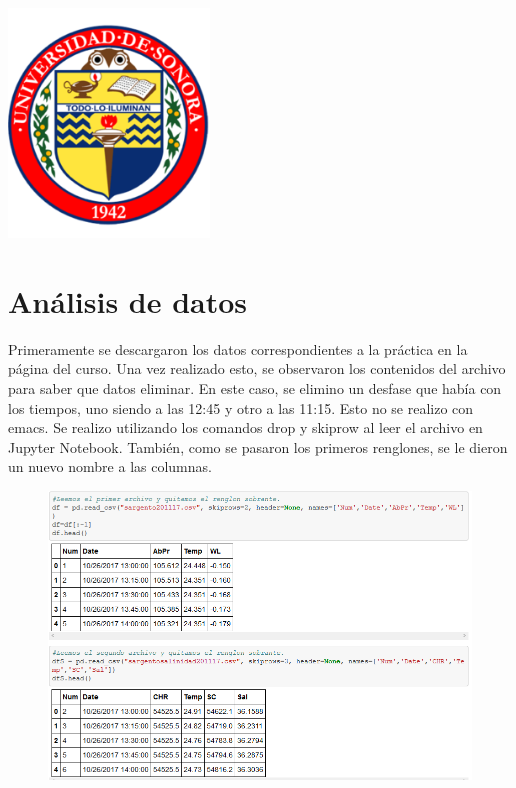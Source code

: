 \documentclass[12pt]{article}
\begin{document}
\begin{titlepage}
\includegraphics[width=0.4\textwidth]{logo.png}\\
 

\vfill %

\end{titlepage}

\section{Análisis de datos}
Primeramente se descargaron los datos correspondientes a la práctica en la página del curso. Una vez realizado esto, se observaron los contenidos del archivo para saber que datos eliminar. En este caso, se elimino un desfase que había con los tiempos, uno siendo a las 12:45 y otro a las 11:15. Esto no se realizo con emacs. Se realizo utilizando los comandos drop y skiprow al leer el archivo en Jupyter Notebook. También, como se pasaron los primeros renglones, se le dieron un nuevo nombre a las columnas. \\

\begin{figure}[h]
    \centering
\includegraphics[width=5in]{Datos.png}
\end{figure}
\end{document}
